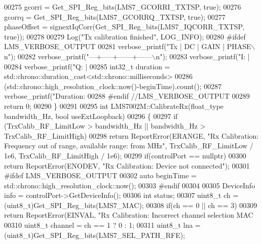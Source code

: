 \begin{DoxyCode}
{{{{{{{00275     gcorri = Get_SPI_Reg_bits(LMS7_GCORRI_TXTSP, \textcolor{keyword}{true});
00276     gcorrq = Get_SPI_Reg_bits(LMS7_GCORRQ_TXTSP, \textcolor{keyword}{true});
00277     phaseOffset = signextIqCorr(Get_SPI_Reg_bits(LMS7_IQCORR_TXTSP, \textcolor{keyword}{true}));
00278 
00279     Log(\textcolor{stringliteral}{"Tx calibration finished"}, LOG\_INFO);
00280 \textcolor{preprocessor}{#ifdef LMS\_VERBOSE\_OUTPUT}
00281     verbose_printf(\textcolor{stringliteral}{"Tx | DC  | GAIN | PHASE\(\backslash\)n"});
00282     verbose_printf(\textcolor{stringliteral}{"---+-----+------+------\(\backslash\)n"});
00283     verbose_printf(\textcolor{stringliteral}{"I: | %
00284     verbose_printf(\textcolor{stringliteral}{"Q: | %
00285     int32\_t duration = std::chrono::duration\_cast<std::chrono::milliseconds>
00286         (std::chrono::high\_resolution\_clock::now()-beginTime).count();
00287     verbose_printf(\textcolor{stringliteral}{"Duration: %
00288 \textcolor{preprocessor}{#endif //LMS\_VERBOSE\_OUTPUT}
00289     \textcolor{keywordflow}{return} 0;
00290 \}
00291 
00295 \textcolor{keywordtype}{int} LMS7002M::CalibrateRx(float_type bandwidth\_Hz, \textcolor{keywordtype}{bool} useExtLoopback)
00296 \{
00297     \textcolor{keywordflow}{if} (TrxCalib_RF_LimitLow > bandwidth\_Hz || bandwidth\_Hz > 
      TrxCalib_RF_LimitHigh)
00298         \textcolor{keywordflow}{return} ReportError(ERANGE, \textcolor{stringliteral}{"Rx Calibration: Frequency out of range, available range: from %
       MHz"}, TrxCalib_RF_LimitLow / 1e6, TrxCalib_RF_LimitHigh / 1e6);
00299     \textcolor{keywordflow}{if}(controlPort == \textcolor{keyword}{nullptr})
00300         \textcolor{keywordflow}{return} ReportError(ENODEV, \textcolor{stringliteral}{"Rx Calibration: Device not connected"});
00301 \textcolor{preprocessor}{#ifdef LMS\_VERBOSE\_OUTPUT}
00302     \textcolor{keyword}{auto} beginTime = std::chrono::high\_resolution\_clock::now();
00303 \textcolor{preprocessor}{#endif}
00304 
00305     DeviceInfo info = controlPort->GetDeviceInfo();
00306     \textcolor{keywordtype}{int} status;
00307     uint8\_t ch = (uint8\_t)Get_SPI_Reg_bits(LMS7_MAC);
00308     \textcolor{keywordflow}{if}(ch == 0 || ch == 3)
00309         \textcolor{keywordflow}{return} ReportError(EINVAL, \textcolor{stringliteral}{"Rx Calibration: Incorrect channel selection MAC %
00310     uint8\_t channel = ch == 1 ? 0 : 1;
00311     uint8\_t lna = (uint8\_t)Get_SPI_Reg_bits(LMS7_SEL_PATH_RFE);
}}}}}}}}}}}
\end{DoxyCode}
